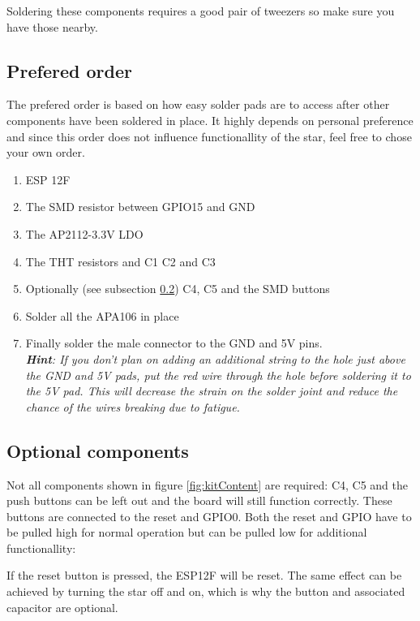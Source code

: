 \documentclass[12pt]{article}
\begin{document}
\noindent Soldering these components requires a good pair of tweezers so make sure you have those nearby.

\subsection{Prefered order}
The prefered order is based on how easy solder pads are to access after other components have been soldered in place.
It highly depends on personal preference and since this order does not influence functionallity of the star, feel free to chose your own order.
\begin{enumerate}
	\item ESP 12F
	\item The SMD resistor between GPIO15 and GND
	\item The AP2112-3.3V LDO
	\item The THT resistors and C1 C2 and C3
	\item Optionally (see subsection \ref{subsec:optionalComponents}) C4, C5 and the SMD buttons
	\item Solder all the APA106 in place
	\item Finally solder the male connector to the GND and 5V pins.\vspace{1ex}\\ \textit{\textbf{Hint}: If you don't plan on adding an additional string to the hole just above the GND and 5V pads, put the red wire through the hole before soldering it to the 5V pad. This will decrease the strain on the solder joint and reduce the chance of the wires breaking due to fatigue.}
\end{enumerate}

\subsection{Optional components}
\label{subsec:optionalComponents}
Not all components shown in figure \ref{fig:kitContent} are required: C4, C5 and the push buttons can be left out and the board will still function correctly. These buttons are connected to the reset and GPIO0. Both the reset and GPIO have to be pulled high for normal operation but can be pulled low for additional functionallity:

\noindent If the reset button is pressed, the ESP12F will be reset. The same effect can be achieved by turning the star off and on, which is why the button and associated capacitor are optional.
\end{document}
